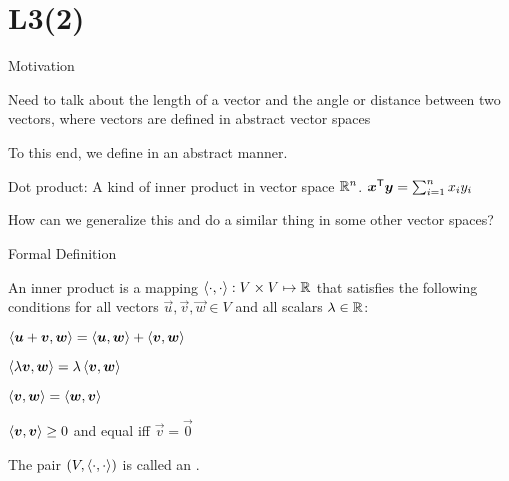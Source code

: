 \documentclass[fleqn,aspectratio=169]{beamer}
\begin{document}
\section{L3(2)}
\begin{frame}{Motivation}

\plitemsep 0.1in

\bci 
\item Need to talk about the length of a vector and the angle or distance between two vectors, where vectors are defined in abstract vector spaces

\item To this end, we define  in an abstract manner.

\item Dot product: A kind of inner product in vector space ${\mathbb R}^n$. ${\bm{x}}^{\mathsf{T}} \bm{y} = \sum_{i=1}^n x_i y_i$ 


\bigskip
\item \question How can we generalize this and do a similar thing in some other vector spaces?
\eci
\end{frame}

\begin{frame}{Formal Definition}

\plitemsep 0.1in

\bci 
\item An inner product is a mapping $\left\langle \cdot, \cdot \right\rangle: V \times V \mapsto {\mathbb R}$ that satisfies the following conditions for all vectors $\vec{u},\vec{v},\vec{w} \in V$ and all scalars $\lambda \in {\mathbb R}$:

\medskip
\bce
\item $\left\langle \bm{u}+ \bm{v}, \bm{w} \right\rangle = \left\langle \bm{u}, \bm{w} \right\rangle + \left\langle \bm{v}, \bm{w} \right\rangle$
\item $\left\langle \lambda \bm{v}, \bm{w} \right\rangle = \lambda \left\langle \bm{v}, \bm{w} \right\rangle$
\item $\left\langle \bm{v}, \bm{w} \right\rangle = \left\langle \bm{w}, \bm{v} \right\rangle$
\item $\left\langle \bm{v}, \bm{v} \right\rangle \ge 0$ and equal iff $\vec{v}=\vec{0}$
\ece
\medskip

\item The pair $(V,\left\langle \cdot, \cdot \right\rangle)$ is called an .

\eci
\end{frame}
\end{document}
